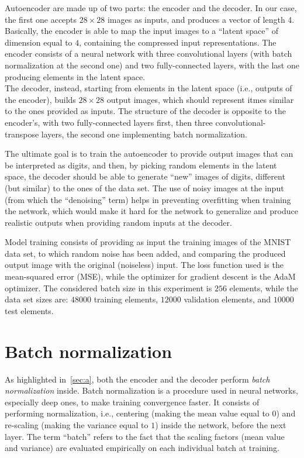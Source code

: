 \documentclass[12pt]{article}
\begin{document}
Autoencoder are made up of two parts: the encoder and the decoder.
In our case, the first one accepts $28 \times 28$ images as inputs, and produces a vector of length 4. 
Basically, the encoder is able to map the input images to a ``latent space'' of dimension equal to $4$, containing the compressed input representations.
The encoder consists of a neural network with three convolutional layers (with batch normalization at the second one) and two fully-connected layers, with the last one producing elements in the latent space.\\
The decoder, instead, starting from elements in the latent space (i.e., outputs of the encoder), builds $28 \times 28$ output images, which should represent itmes similar to the ones provided as inputs.
The structure of the decoder is opposite to the encoder's, with two fully-connected layers first, then three convolutional-transpose layers, the second one implementing batch normalization.

The ultimate goal is to train the autoencoder to provide output images that can be interpreted as digits, and then, by picking random elements in the latent space, the decoder should be able to generate ``new'' images of digits, different (but similar) to the ones of the data set.
The use of noisy images at the input (from which the ``denoising'' term) helps in preventing overfitting when training the network, which would make it hard for the network to generalize and produce realistic outputs when providing random inputs at the decoder.

Model training consists of providing as input the training images of the MNIST data set, to which random noise has been added, and comparing the produced output image with the original (noiseless) input.
The loss function used is the mean-squared error (MSE), while the optimizer for gradient descent is the AdaM optimizer.
The considered batch size in this experiment is $256$ elements, while the data set sizes are: $48000$ training elements, $12000$ validation elements, and $10000$ test elements.

\section{Batch normalization}\label{sec:b}

As highlighted in\ \ref{sec:a}, both the encoder and the decoder perform \textit{batch normalization} inside.
Batch normalization is a procedure used in neural networks, especially deep ones, to make training convergence faster.
It consists of performing normalization, i.e., centering (making the mean value equal to $0$) and re-scaling (making the variance equal to $1$) inside the network, before the next layer.
The term ``batch'' refers to the fact that the scaling factors (mean value and variance) are evaluated empirically on each individual batch at training.
\end{document}
